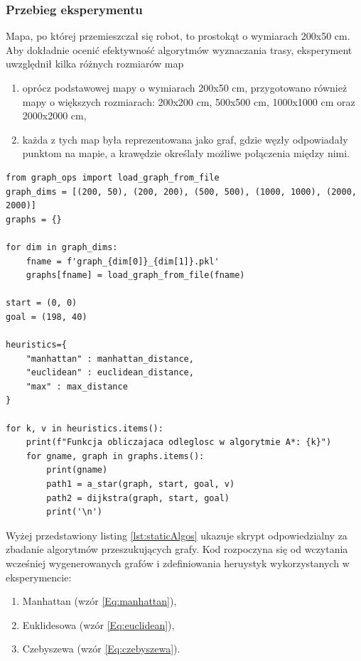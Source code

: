 \documentclass[12pt,twoside]{article}
\begin{document}
\subsubsection{Przebieg eksperymentu}
Mapa, po której przemieszczał się robot, to prostokąt o wymiarach 200x50 cm. Aby dokładnie ocenić efektywność algorytmów wyznaczania trasy, eksperyment uwzględnił kilka różnych rozmiarów map

\begin{enumerate}[label=\alph*), leftmargin=1.25cm]
	\item oprócz podstawowej mapy o wymiarach 200x50 cm, przygotowano również mapy o większych rozmiarach: 200x200 cm, 500x500 cm, 1000x1000 cm oraz 2000x2000 cm,
	\item każda z tych map była reprezentowana jako graf, gdzie węzły odpowiadały punktom na mapie, a krawędzie określały możliwe połączenia między nimi.
	
\end{enumerate}

\begin{lstlisting}[caption={Porównanie algorytmów}, label={lst:staticAlgos}]
from graph_ops import load_graph_from_file
graph_dims = [(200, 50), (200, 200), (500, 500), (1000, 1000), (2000, 2000)]
graphs = {}

for dim in graph_dims:
    fname = f'graph_{dim[0]}_{dim[1]}.pkl'
    graphs[fname] = load_graph_from_file(fname)

start = (0, 0)
goal = (198, 40)

heuristics={
    "manhattan" : manhattan_distance,
    "euclidean" : euclidean_distance,
    "max" : max_distance
}

for k, v in heuristics.items():
    print(f"Funkcja obliczajaca odleglosc w algorytmie A*: {k}")
    for gname, graph in graphs.items():
        print(gname)
        path1 = a_star(graph, start, goal, v)
        path2 = dijkstra(graph, start, goal)
        print('\n')
\end{lstlisting}

Wyżej przedstawiony listing \ref{lst:staticAlgos} ukazuje skrypt odpowiedzialny za zbadanie algorytmów przeszukujących grafy. Kod rozpoczyna się od wczytania wcześniej wygenerowanych grafów i zdefiniowania heruystyk wykorzystanych w eksperymencie:

\begin{enumerate}[label=\alph*), leftmargin=1.25cm]
	\item Manhattan (wzór \ref{Eq:manhattan}),
	\item Euklidesowa (wzór \ref{Eq:euclidean}),
	\item Czebyszewa (wzór \ref{Eq:czebyszewa}).
	
\end{enumerate}
\end{document}
